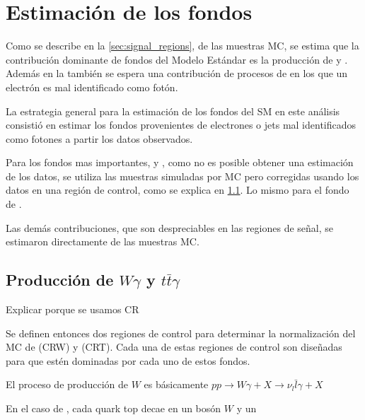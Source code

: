 \chapter{Estimación de los fondos} \label{cap:fondos}

Como se describe en la \cref{sec:signal_regions}, de las muestras MC, se estima
que la contribución dominante de fondos del Modelo Estándar es la producción de
{\wgam} y {\ttgam}. Además en la {\SRL} también se espera una contribución de
procesos de {\ttbar} en los que un electrón es mal identificado como fotón.

La estrategia general para la estimación de los fondos del SM en este análisis
consistió en estimar los fondos provenientes de electrones o jets mal
identificados como fotones a partir los datos observados.

Para los fondos mas importantes, {\wgam} y {\ttgam}, como no es posible obtener
una estimación de los datos, se utiliza las muestras simuladas por MC pero
corregidas usando los datos en una región de control, como se explica en
\cref{sec:bkg_wgam_ttgam}. Lo mismo para el fondo de {\gjet}.


Las demás contribuciones, que son despreciables en las regiones de señal, se
estimaron directamente de las muestras MC.



\section[Cambiar después]{Producción de $W\gamma$ y $t\bar{t}\gamma$}
\label{sec:bkg_wgam_ttgam}

Explicar porque se usamos CR


Se definen entonces dos regiones de control para determinar la normalización del
MC de {\wgam} (CRW) y {\ttgam} (CRT). Cada una de estas regiones de control son
diseñadas para que estén dominadas por cada uno de estos fondos.

El proceso de producción de $W${\wgam} es básicamente $pp \to W\gamma + X \to \nu_l \bar{l}\gamma + X$

En el caso de {\ttgam}, cada quark top decae en un bosón $W$ y un {\bjet}

